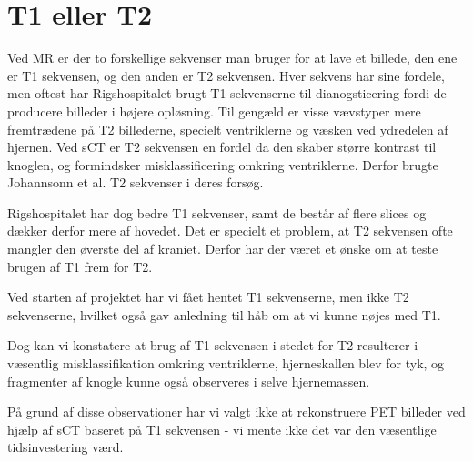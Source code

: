 \section{T1 eller T2}

Ved MR er der to forskellige sekvenser man bruger for at lave et billede, den ene er T1 sekvensen, og den anden er T2 sekvensen. Hver sekvens har sine fordele, men oftest har Rigshospitalet brugt T1 sekvenserne til dianogsticering fordi de producere billeder i højere opløsning. Til gengæld er visse vævstyper mere fremtrædene på T2 billederne, specielt ventriklerne og væsken ved ydredelen af hjernen. Ved sCT er T2 sekvensen en fordel da den skaber større kontrast til knoglen, og formindsker misklassificering omkring ventriklerne. Derfor brugte Johannsonn et al. T2 sekvenser i deres forsøg.

Rigshospitalet har dog bedre T1 sekvenser, samt de består af flere slices og dækker derfor mere af hovedet. Det er specielt et problem, at T2 sekvensen ofte mangler den øverste del af kraniet. Derfor har der været et ønske om at teste brugen af T1 frem for T2.

Ved starten af projektet har vi fået hentet T1 sekvenserne, men ikke T2 sekvenserne, hvilket også gav anledning til håb om at vi kunne nøjes med T1.

Dog kan vi konstatere at brug af T1 sekvensen i stedet for T2 resulterer i væsentlig misklassifikation omkring ventriklerne, hjerneskallen blev for tyk, og fragmenter af knogle kunne også observeres i selve hjernemassen. 

På grund af disse observationer har vi valgt ikke at rekonstruere PET billeder ved hjælp af sCT baseret på T1 sekvensen - vi mente ikke det var den væsentlige tidsinvestering værd.

